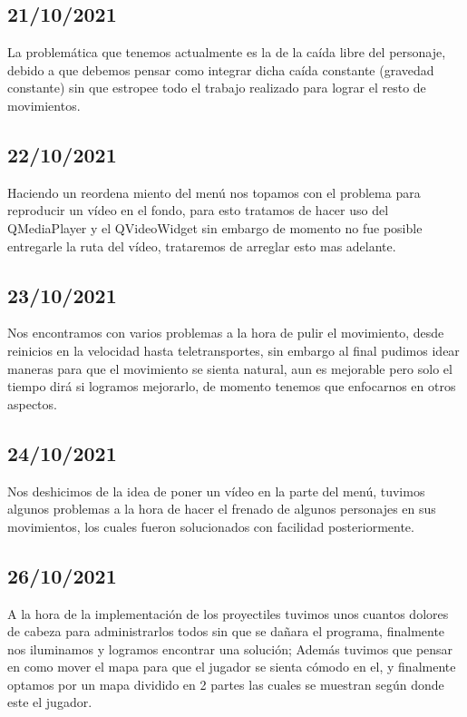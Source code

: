 \documentclass{article}
\begin{document}
    \subsection{21/10/2021}
    La problemática que tenemos actualmente es la de la caída libre del personaje, debido a que debemos pensar como integrar dicha caída constante (gravedad constante) sin que estropee todo el trabajo realizado para lograr el resto de movimientos.
    
    \subsection{22/10/2021}
    Haciendo un reordena miento del menú nos topamos con el problema para reproducir un vídeo en el fondo, para esto tratamos de hacer uso del QMediaPlayer y el QVideoWidget sin embargo de momento no fue posible entregarle la ruta del vídeo, trataremos de arreglar esto mas adelante.
    
    \subsection{23/10/2021}
    Nos encontramos con varios problemas a la hora de pulir el movimiento, desde reinicios en la velocidad hasta teletransportes, sin embargo al final pudimos idear maneras para que el movimiento se sienta natural, aun es mejorable pero solo el tiempo dirá si logramos mejorarlo, de momento tenemos que enfocarnos en otros aspectos.
    
    \subsection{24/10/2021}
    Nos deshicimos de la idea de poner un vídeo en la parte del menú, tuvimos algunos problemas a la hora de hacer el frenado de algunos personajes en sus movimientos, los cuales fueron solucionados con facilidad posteriormente.
    
    \subsection{26/10/2021}
    A la hora de la implementación de los proyectiles tuvimos unos cuantos dolores de cabeza para administrarlos todos sin que se dañara el programa, finalmente nos iluminamos y logramos encontrar una solución; Además tuvimos que pensar en como mover el mapa para que el jugador se sienta cómodo en el, y finalmente optamos por un mapa dividido en 2 partes las cuales se muestran según donde este el jugador.
    
\end{document}
